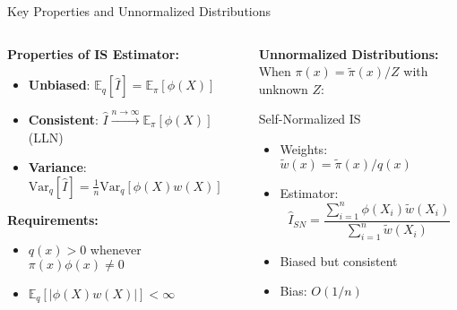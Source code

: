 \documentclass[aspectratio=169]{beamer}
\begin{document}
\begin{frame}{Key Properties and Unnormalized Distributions}
	\begin{columns}
		\begin{column}{0.5\textwidth}
			\textbf{Properties of IS Estimator:}
			\begin{itemize}
				\item \textbf{Unbiased}: $\mathbb{E}_q[\hat{I}] = \mathbb{E}_\pi[\phi(X)]$
				\item \textbf{Consistent}: $\hat{I} \xrightarrow{n\to\infty} \mathbb{E}_\pi[\phi(X)]$ (LLN)
				\item \textbf{Variance}: $\text{Var}_q[\hat{I}] = \frac{1}{n}\text{Var}_q[\phi(X)w(X)]$
			\end{itemize}

			\vspace{0.3cm}
			\textbf{Requirements:}
			\begin{itemize}
				\item $q(x) > 0$ whenever $\pi(x)\phi(x) \neq 0$
				\item $\mathbb{E}_q[|\phi(X)w(X)|] < \infty$
			\end{itemize}
		\end{column}

		\begin{column}{0.5\textwidth}
			\textbf{Unnormalized Distributions:}\\
			When $\pi(x) = \tilde{\pi}(x)/Z$ with unknown $Z$:

			\begin{block}{Self-Normalized IS}
				\begin{itemize}
					\item Weights: $\tilde{w}(x) = \tilde{\pi}(x)/q(x)$
					\item Estimator: $$\hat{I}_{SN} = \frac{\sum_{i=1}^n \phi(X_i)\tilde{w}(X_i)}{\sum_{i=1}^n \tilde{w}(X_i)}$$
					\item Biased but consistent
					\item Bias: $O(1/n)$
				\end{itemize}
			\end{block}
		\end{column}
	\end{columns}
\end{frame}
\end{document}
